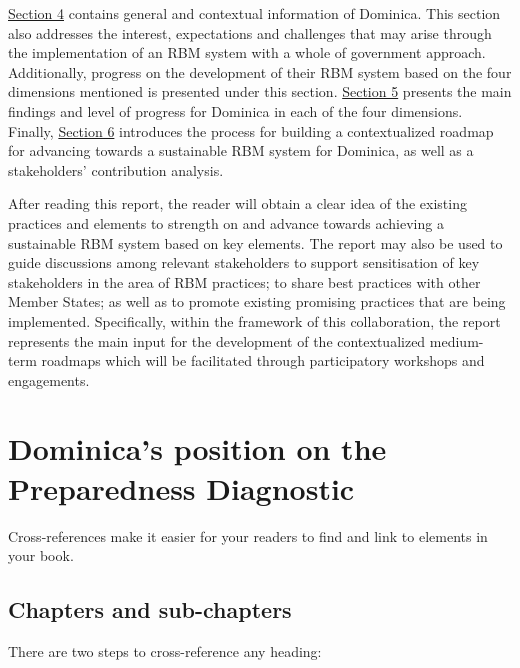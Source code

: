 \documentclass[
]{book}
\begin{document}
\protect\hyperlink{section4}{Section 4} contains general and contextual information of Dominica. This section also addresses the interest, expectations and challenges that may arise through the implementation of an RBM system with a whole of government approach. Additionally, progress on the development of their RBM system based on the four dimensions mentioned is presented under this section.
\protect\hyperlink{section5}{Section 5} presents the main findings and level of progress for Dominica in each of the four dimensions. Finally, \protect\hyperlink{section6}{Section 6} introduces the process for building a contextualized roadmap for advancing towards a sustainable RBM system for Dominica, as well as a stakeholders' contribution analysis.

After reading this report, the reader will obtain a clear idea of the existing practices and elements to strength on and advance towards achieving a sustainable RBM system based on key elements. The report may also be used to guide discussions among relevant stakeholders to support sensitisation of key stakeholders in the area of RBM practices; to share best practices with other Member States; as well as to promote existing promising practices that are being implemented.
Specifically, within the framework of this collaboration, the report represents the main input for the development of the contextualized medium-term roadmaps which will be facilitated through participatory workshops and engagements.

\hypertarget{section2}{%
\chapter{Dominica's position on the Preparedness Diagnostic}\label{section2}}

Cross-references make it easier for your readers to find and link to elements in your book.

\hypertarget{chapters-and-sub-chapters}{%
\section{Chapters and sub-chapters}\label{chapters-and-sub-chapters}}

There are two steps to cross-reference any heading:
\end{document}

